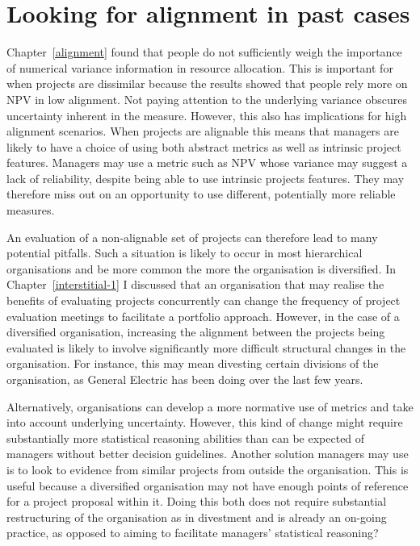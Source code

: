 \documentclass[a4paper, nobind, dvipsnames]{templates/ociamthesis}
\theoremstyle{definition}
\theoremstyle{definition}
\theoremstyle{definition}
\theoremstyle{definition}
\theoremstyle{remark}
\begin{document}
\newpage

\printbibliography[segment=\therefsegment,heading=subbibintoc]

\hypertarget{interstitial-2}{%
\chapter{Looking for alignment in past cases}\label{interstitial-2}}

Chapter~\ref{alignment} found that people do not sufficiently weigh the
importance of numerical variance information in resource allocation. This is
important for when projects are dissimilar because the results showed that
people rely more on NPV in low alignment. Not paying attention to the underlying
variance obscures uncertainty inherent in the measure. However, this also has
implications for high alignment scenarios. When projects are alignable this
means that managers are likely to have a choice of using both abstract metrics
as well as intrinsic project features. Managers may use a metric such as NPV
whose variance may suggest a lack of reliability, despite being able to use
intrinsic projects features. They may therefore miss out on an opportunity to
use different, potentially more reliable measures.

An evaluation of a non-alignable set of projects can therefore lead to many
potential pitfalls. Such a situation is likely to occur in most hierarchical
organisations and be more common the more the organisation is diversified. In
Chapter~\ref{interstitial-1} I discussed that an organisation that may realise
the benefits of evaluating projects concurrently can change the frequency of
project evaluation meetings to facilitate a portfolio approach. However, in the
case of a diversified organisation, increasing the alignment between the
projects being evaluated is likely to involve significantly more difficult
structural changes in the organisation. For instance, this may mean divesting
certain divisions of the organisation, as General Electric has been doing over
the last few years.

Alternatively, organisations can develop a more normative use of metrics and
take into account underlying uncertainty. However, this kind of change might
require substantially more statistical reasoning abilities than can be expected
of managers without better decision guidelines. Another solution managers may
use is to look to evidence from similar projects from outside the organisation.
This is useful because a diversified organisation may not have enough points of
reference for a project proposal within it. Doing this both does not require
substantial restructuring of the organisation as in divestment and is already an
on-going practice, as opposed to aiming to facilitate managers' statistical
reasoning?
\end{document}
